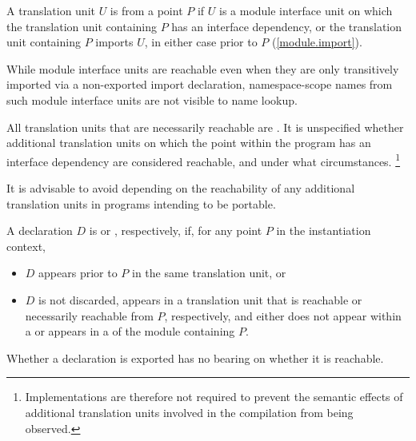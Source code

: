 \pnum
A translation unit $U$ is
from a point $P$ if
$U$ is a module interface unit on which the translation unit containing $P$
has an interface dependency, or
the translation unit containing $P$ imports $U$,
in either case prior to $P$ (\ref{module.import}).
\begin{note}
While module interface units are reachable even when they are only
transitively imported via a non-exported import declaration,
namespace-scope names from such module interface units are not visible
to name lookup.
\end{note}

\pnum
All translation units that are necessarily reachable are
.
It is unspecified whether additional translation units on which the
point within the program has an interface dependency are considered reachable,
and under what circumstances.%
\footnote{Implementations are therefore not required to prevent the semantic
effects of additional translation units involved in the compilation from being
observed.}
\begin{note}
It is advisable to avoid
depending on the reachability of any additional translation units
in programs intending to be portable.
\end{note}

\pnum
A declaration $D$ is
 or
,
respectively, if,
for any point $P$ in the
instantiation context,
\begin{itemize}
\item $D$ appears prior to $P$ in the same translation unit, or
\item $D$ is not discarded,
appears in a translation unit that is
reachable or necessarily reachable from $P$, respectively,
and
either does not appear within a 
or appears in a 
of the module containing $P$.
\end{itemize}
\begin{note}
Whether a declaration is exported has no bearing on whether it is reachable.
\end{note}

